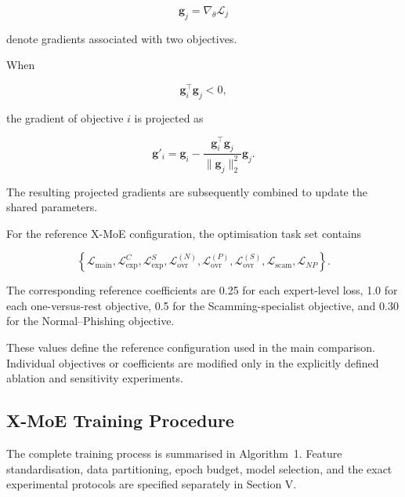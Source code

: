 \documentclass{ieeeaccess}
\begin{document}
\begin{equation}
\mathbf{g}_j
=
\nabla_{\theta}\mathcal{L}_j
\end{equation}

denote gradients associated with two objectives.

When

\begin{equation}
\mathbf{g}_i^{\top}\mathbf{g}_j < 0,
\end{equation}

the gradient of objective \(i\) is projected as

\begin{equation}
\mathbf{g}'_i
=
\mathbf{g}_i
-
\frac{
\mathbf{g}_i^{\top}\mathbf{g}_j
}{
\|\mathbf{g}_j\|_2^2
}
\mathbf{g}_j.
\label{eq:pcgrad}
\end{equation}

The resulting projected gradients are subsequently combined to update the shared parameters.

For the reference X-MoE configuration, the optimisation task set contains

\begin{equation}
\left\{
\mathcal{L}_{\mathrm{main}},
\mathcal{L}^{C}_{\mathrm{exp}},
\mathcal{L}^{S}_{\mathrm{exp}},
\mathcal{L}^{(N)}_{\mathrm{ovr}},
\mathcal{L}^{(P)}_{\mathrm{ovr}},
\mathcal{L}^{(S)}_{\mathrm{ovr}},
\mathcal{L}_{\mathrm{scam}},
\mathcal{L}_{NP}
\right\}.
\end{equation}

The corresponding reference coefficients are 0.25 for each expert-level loss, 1.0 for each one-versus-rest objective, 0.5 for the Scamming-specialist objective, and 0.30 for the Normal--Phishing objective.

These values define the reference configuration used in the main comparison. Individual objectives or coefficients are modified only in the explicitly defined ablation and sensitivity experiments.


\subsection{X-MoE Training Procedure}

The complete training process is summarised in Algorithm~1. Feature standardisation, data partitioning, epoch budget, model selection, and the exact experimental protocols are specified separately in Section V.
\end{document}
